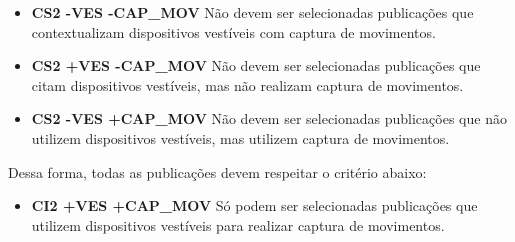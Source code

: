 \begin{enumerate}
    \begin{itemize}
    	\item \textbf{CS2 -VES -CAP\_MOV} Não devem ser selecionadas publicações que contextualizam dispositivos vestíveis com captura de movimentos.
        \item \textbf{CS2 +VES -CAP\_MOV} Não devem ser selecionadas publicações que citam dispositivos vestíveis, mas não realizam captura de movimentos.
        \item \textbf{CS2 -VES +CAP\_MOV} Não devem ser selecionadas publicações que não utilizem dispositivos vestíveis, mas utilizem captura de movimentos.
    \end{itemize}
    Dessa forma, todas as publicações devem respeitar o critério abaixo:
    \begin{itemize}
    	\item \textbf{CI2 +VES +CAP\_MOV} Só podem ser selecionadas publicações que utilizem dispositivos vestíveis para realizar captura de movimentos.
    \end{itemize}
\end{enumerate}



